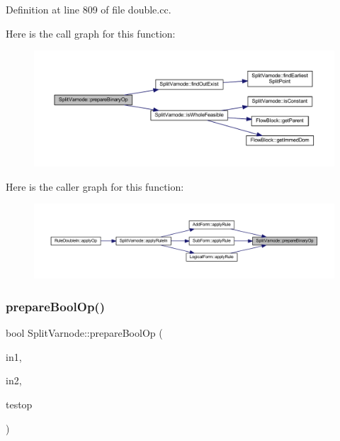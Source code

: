 Definition at line 809 of file double.\+cc.

Here is the call graph for this function\+:
\nopagebreak
\begin{figure}[H]
\begin{center}
\leavevmode
\includegraphics[width=350pt]{class_split_varnode_a38d72b3185eeb4255fb3d1c997780977_cgraph}
\end{center}
\end{figure}
Here is the caller graph for this function\+:
\nopagebreak
\begin{figure}[H]
\begin{center}
\leavevmode
\includegraphics[width=350pt]{class_split_varnode_a38d72b3185eeb4255fb3d1c997780977_icgraph}
\end{center}
\end{figure}
\mbox{\label{class_split_varnode_ab869c695dd00e22e544be6f0090178af}} 
\subsubsection{\texorpdfstring{prepareBoolOp()}{prepareBoolOp()}}
{\footnotesize\ttfamily bool Split\+Varnode\+::prepare\+Bool\+Op (\begin{DoxyParamCaption}\item[{\mbox{\hyperlink{class_split_varnode}{Split\+Varnode}} \&}]{in1,  }\item[{\mbox{\hyperlink{class_split_varnode}{Split\+Varnode}} \&}]{in2,  }\item[{\mbox{\hyperlink{class_pcode_op}{Pcode\+Op}} $\ast$}]{testop }\end{DoxyParamCaption})\hspace{0.3cm}{\ttfamily [static]}}



